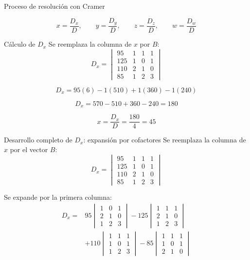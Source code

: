 \documentclass[aspectratio=169]{beamer}
\newcommand{\detm}[1]{\begin{vmatrix}#1\end{vmatrix}}
\begin{document}
\begin{frame}{Proceso de resolución con Cramer}
\begin{center}
\end{center}

\[
x=\frac{D_x}{D},\qquad y=\frac{D_y}{D},\qquad z=\frac{D_z}{D},\qquad w=\frac{D_w}{D}
\]
\end{frame}

\begin{frame}[shrink=6]{Cálculo de $D_x$}
Se reemplaza la columna de $x$ por $B$:
\[
D_x=\detm{
95&1&1&1\\
125&1&0&1\\
110&2&1&0\\
85&1&2&3}
\]

\[
D_x=95(6)-1(510)+1(360)-1(240)
\]

\[
D_x=570-510+360-240=\boxed{180}
\]

\[
x=\frac{D_x}{D}=\frac{180}{4}=\boxed{45}
\]
\end{frame}

\begin{frame}[shrink=10]{Desarrollo completo de $D_x$: expansión por cofactores}
Se reemplaza la columna de $x$ por el vector $B$:
\[
D_x=\detm{
95&1&1&1\\
125&1&0&1\\
110&2&1&0\\
85&1&2&3}
\]

Se expande por la primera columna:
\[
\begin{aligned}
D_x={}&95\detm{1&0&1\\2&1&0\\1&2&3}
-125\detm{1&1&1\\2&1&0\\1&2&3}\\
&+110\detm{1&1&1\\1&0&1\\1&2&3}
-85\detm{1&1&1\\1&0&1\\2&1&0}
\end{aligned}
\]
\end{frame}
\end{document}
